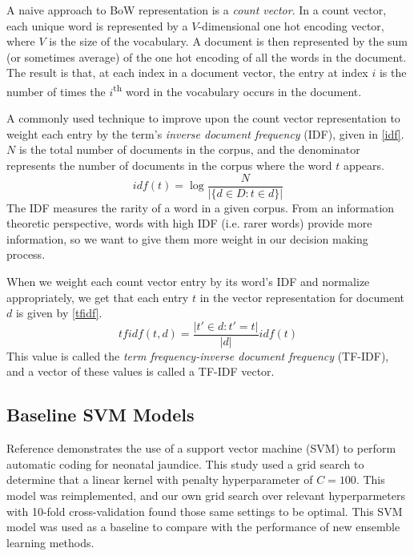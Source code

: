 \documentclass[conference]{IEEEtran}
\begin{document}
A naive approach to BoW representation is a \textit{count vector}. In a count vector, each unique word is represented by a $V$-dimensional one hot encoding vector, where $V$ is the size of the vocabulary. A document is then represented by the sum (or sometimes average) of the one hot encoding of all the words in the document. The result is that, at each index in a document vector, the entry at index $i$ is the number of times the $i$\textsuperscript{th} word in the vocabulary occurs in the document.

A commonly used technique to improve upon the count vector representation to weight each entry by the term's \textit{inverse document frequency} (IDF), given in \eqref{idf}. $N$ is the total number of documents in the corpus, and the denominator represents the number of documents in the corpus where the word $t$ appears.
\begin{equation}
idf(t) = \log \frac{N}{|\{d \in D : t \in d\} |}\label{idf}
\end{equation}
The IDF measures the rarity of a word in a given corpus. From an information theoretic perspective, words with high IDF (i.e. rarer words) provide more information, so we want to give them more weight in our decision making process.

When we weight each count vector entry by its word's IDF and normalize appropriately, we get that each entry $t$ in the vector representation for document $d$ is given by \eqref{tfidf}.
\begin{equation}
tfidf(t, d) = \frac{|t' \in d : t' = t|}{|d|} idf(t)\label{tfidf}
\end{equation}
This value is called the \textit{term frequency-inverse document frequency} (TF-IDF), and a vector of these values is called a TF-IDF vector.

\subsection{Baseline SVM Models}\label{AA}
Reference \cite{MARAFINO} demonstrates the use of a support vector machine (SVM) to perform automatic coding for neonatal jaundice. This study used a grid search to determine that a linear kernel with penalty hyperparameter of $C = 100$. This model was reimplemented, and our own grid search over relevant hyperparmeters with 10-fold cross-validation found those same settings to be optimal. This SVM model was used as a baseline to compare with the performance of new ensemble learning methods. 
\end{document}
